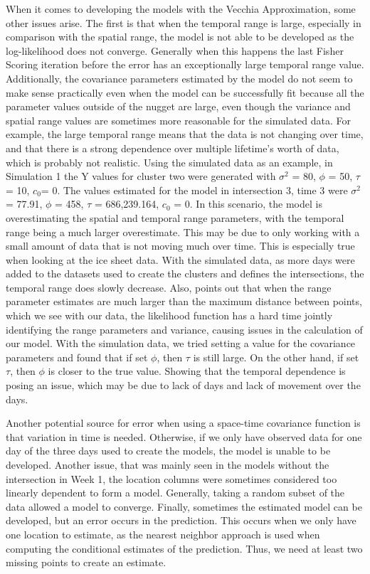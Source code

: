 \documentclass[12pt]{article}
\begin{document}
When it comes to developing the models with the Vecchia Approximation,
some other issues arise. The first is that when the temporal range is
large, especially in comparison with the spatial range, the model is not
able to be developed as the log-likelihood does not converge. Generally
when this happens the last Fisher Scoring iteration before the error has
an exceptionally large temporal range value. Additionally, the
covariance parameters estimated by the model do not seem to make sense
practically even when the model can be successfully fit because all the
parameter values outside of the nugget are large, even though the
variance and spatial range values are sometimes more reasonable for the
simulated data. For example, the large temporal range means that the
data is not changing over time, and that there is a strong dependence
over multiple lifetime's worth of data, which is probably not realistic.
Using the simulated data as an example, in Simulation 1 the Y values for
cluster two were generated with \(\sigma^2\) = 80, \(\phi\) = 50,
\(\tau\) = 10, \(c_0\)= 0. The values estimated for the model in
intersection 3, time 3 were \(\sigma^2\) = 77.91, \(\phi\) = 458,
\(\tau\) = 686,239.164, \(c_0\) = 0. In this scenario, the model is
overestimating the spatial and temporal range parameters, with the
temporal range being a much larger overestimate. This may be due to only
working with a small amount of data that is not moving much over time.
This is especially true when looking at the ice sheet data. With the
simulated data, as more days were added to the datasets used to create
the clusters and defines the intersections, the temporal range does
slowly decrease. Also, \citet{guinness_gaussian_2021} points out that
when the range parameter estimates are much larger than the maximum
distance between points, which we see with our data, the likelihood
function has a hard time jointly identifying the range parameters and
variance, causing issues in the calculation of our model. With the
simulation data, we tried setting a value for the covariance parameters
and found that if set \(\phi\), then \(\tau\) is still large. On the
other hand, if set \(\tau\), then \(\phi\) is closer to the true value.
Showing that the temporal dependence is posing an issue, which may be
due to lack of days and lack of movement over the days.

Another potential source for error when using a space-time covariance
function is that variation in time is needed. Otherwise, if we only have
observed data for one day of the three days used to create the models,
the model is unable to be developed. Another issue, that was mainly seen
in the models without the intersection in Week 1, the location columns
were sometimes considered too linearly dependent to form a model.
Generally, taking a random subset of the data allowed a model to
converge. Finally, sometimes the estimated model can be developed, but
an error occurs in the prediction. This occurs when we only have one
location to estimate, as the nearest neighbor approach is used when
computing the conditional estimates of the prediction. Thus, we need at
least two missing points to create an estimate.
\end{document}
